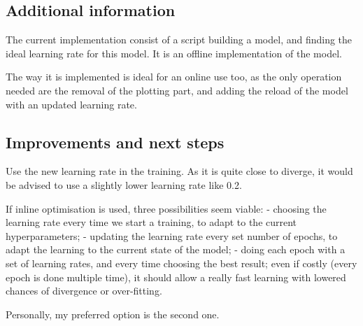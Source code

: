 \subsection{Additional information}

The current implementation consist of a script building a model, and
finding the ideal learning rate for this model. It is an offline
implementation of the model.

The way it is implemented is ideal for an online use too, as the only
operation needed are the removal of the plotting part, and adding the
reload of the model with an updated learning rate.

\subsection{Improvements and next
steps}

Use the new learning rate in the training. As it is quite close to
diverge, it would be advised to use a slightly lower learning rate like
0.2.

If inline optimisation is used, three possibilities seem viable: -
choosing the learning rate every time we start a training, to adapt to
the current hyperparameters; - updating the learning rate every set
number of epochs, to adapt the learning to the current state of the
model; - doing each epoch with a set of learning rates, and every time
choosing the best result; even if costly (every epoch is done multiple
time), it should allow a really fast learning with lowered chances of
divergence or over-fitting.

Personally, my preferred option is the second one.
